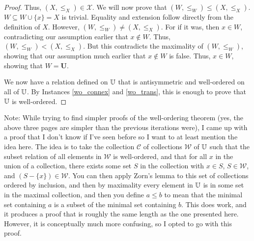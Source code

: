 \documentclass[../../math.tex]{subfiles}
\begin{document}
\begin{proof}
    Thus, $(X, \leq_X) \in \mathcal X$.  We will now prove that $(W, \leq_W)
    \leq (X, \leq_X)$.  $W \subseteq W \cup \{x\} = X$ is trivial.  Equality and
    extension follow directly from the definition of $X$.  However, $(W, \leq_W)
    \neq (X, \leq_X)$.  For if it was, then $x \in W$, contradicting our
    assumption earlier that $x \notin W$.  Thus, $(W, \leq_W) < (X, \leq_X)$.
    But this contradicts the maximality of $(W, \leq_W)$, showing that our
    assumption much earlier that $x \notin W$ is false.  Thus, $x \in W$,
    showing that $W = \bm U$.

    We now have a relation defined on $\mathbb{U}$ that is antisymmetric and
    well-ordered on all of $\mathbb{U}$.  By Instances \ref{wo_connex} and
    \ref{wo_trans}, this is enough to prove that $\mathbb{U}$ is well-ordered.
\end{proof}

Note: While trying to find simpler proofs of the well-ordering theorem (yes, the
above three pages are simpler than the previous iterations were), I came up with
a proof that I don't know if I've seen before so I want to at least mention the
idea here.  The idea is to take the collection $\mathcal C$ of collections
$\mathcal W$ of $\mathbb{U}$ such that the subset relation of all elements in $\mathcal
W$ is well-ordered, and that for all $x$ in the union of a collection, there
exists some set $S$ in the collection with $x \in S$, $S \in \mathcal W$, and
$(S - \{x\}) \in \mathcal W$.  You can then apply Zorn's lemma to this set of
collections ordered by inclusion, and then by maximality every element in $\mathbb{U}$
is in some set in the maximal collection, and then you define $a \leq b$ to mean
that the minimal set containing $a$ is a subset of the minimal set containing
$b$.  This does work, and it produces a proof that is roughly the same length as
the one presented here.  However, it is conceptually much more confusing, so I
opted to go with this proof.
\end{document}
